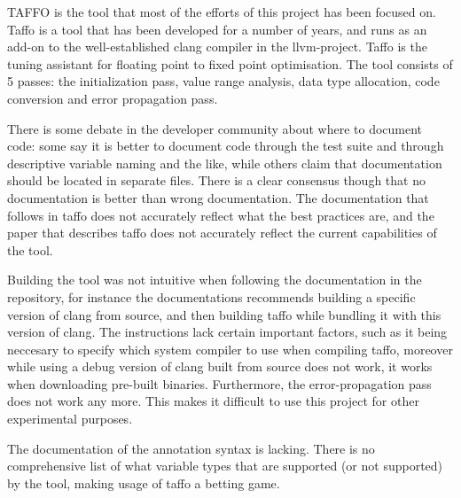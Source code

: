 TAFFO is the tool that most of the efforts of this project has been focused on. Taffo is a tool that has been developed for a number of years, and runs as an add-on to the well-established clang compiler in the llvm-project.
Taffo is the tuning assistant for floating point to fixed point optimisation. The tool consists of 5 passes: the initialization pass, value range analysis, data type allocation, code conversion and error propagation pass.

There is some debate in the developer community about where to document code: some say it is better to document code through the test suite and through descriptive variable naming and the like, while others claim that documentation should be located in separate files. There is a clear consensus though that no documentation is better than wrong documentation.
The documentation that follows in taffo does not accurately reflect what the best practices are, and the paper that describes taffo does not accurately reflect the current capabilities of the tool.

Building the tool was not intuitive when following the documentation in the repository, for instance the documentations recommends building a specific version of clang from source, and then building taffo while bundling it with this version of clang. The instructions lack certain important factors, such as it being neccesary to specify which system compiler to use when compiling taffo, moreover while using a debug version of clang built from source does not work, it works when downloading pre-built binaries.
Furthermore, the error-propagation pass does not work any more. This makes it difficult to use this project for other experimental purposes.

The documentation of the annotation syntax is lacking. There is no comprehensive list of what variable types that are supported (or not supported) by the tool, making usage of taffo a betting game.